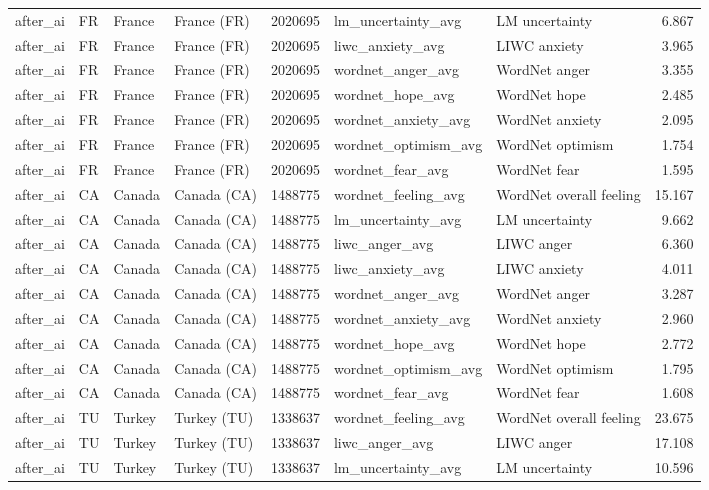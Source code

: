 \begin{tabular}{llllrllr}
after\_ai & FR & France & France (FR) & 2020695 & lm\_uncertainty\_avg & LM uncertainty & 6.867 \\
after\_ai & FR & France & France (FR) & 2020695 & liwc\_anxiety\_avg & LIWC anxiety & 3.965 \\
after\_ai & FR & France & France (FR) & 2020695 & wordnet\_anger\_avg & WordNet anger & 3.355 \\
after\_ai & FR & France & France (FR) & 2020695 & wordnet\_hope\_avg & WordNet hope & 2.485 \\
after\_ai & FR & France & France (FR) & 2020695 & wordnet\_anxiety\_avg & WordNet anxiety & 2.095 \\
after\_ai & FR & France & France (FR) & 2020695 & wordnet\_optimism\_avg & WordNet optimism & 1.754 \\
after\_ai & FR & France & France (FR) & 2020695 & wordnet\_fear\_avg & WordNet fear & 1.595 \\
after\_ai & CA & Canada & Canada (CA) & 1488775 & wordnet\_feeling\_avg & WordNet overall feeling & 15.167 \\
after\_ai & CA & Canada & Canada (CA) & 1488775 & lm\_uncertainty\_avg & LM uncertainty & 9.662 \\
after\_ai & CA & Canada & Canada (CA) & 1488775 & liwc\_anger\_avg & LIWC anger & 6.360 \\
after\_ai & CA & Canada & Canada (CA) & 1488775 & liwc\_anxiety\_avg & LIWC anxiety & 4.011 \\
after\_ai & CA & Canada & Canada (CA) & 1488775 & wordnet\_anger\_avg & WordNet anger & 3.287 \\
after\_ai & CA & Canada & Canada (CA) & 1488775 & wordnet\_anxiety\_avg & WordNet anxiety & 2.960 \\
after\_ai & CA & Canada & Canada (CA) & 1488775 & wordnet\_hope\_avg & WordNet hope & 2.772 \\
after\_ai & CA & Canada & Canada (CA) & 1488775 & wordnet\_optimism\_avg & WordNet optimism & 1.795 \\
after\_ai & CA & Canada & Canada (CA) & 1488775 & wordnet\_fear\_avg & WordNet fear & 1.608 \\
after\_ai & TU & Turkey & Turkey (TU) & 1338637 & wordnet\_feeling\_avg & WordNet overall feeling & 23.675 \\
after\_ai & TU & Turkey & Turkey (TU) & 1338637 & liwc\_anger\_avg & LIWC anger & 17.108 \\
after\_ai & TU & Turkey & Turkey (TU) & 1338637 & lm\_uncertainty\_avg & LM uncertainty & 10.596 \\

\end{tabular}
